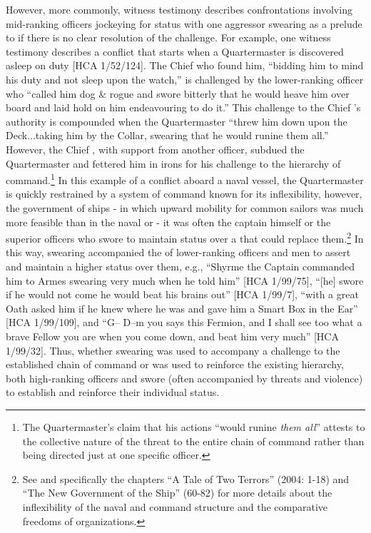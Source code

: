 However, more commonly, witness testimony describes confrontations involving mid-ranking officers jockeying for status with one aggressor swearing as a prelude to  if there is no clear resolution of the challenge. For example, one witness testimony describes a conflict that starts when a Quartermaster is discovered asleep on duty [HCA 1/52/124]. The Chief  who found him, “bidding him to mind his duty and not sleep upon the watch,” is challenged by the lower-ranking officer who “called him dog \& rogue and swore bitterly that he would heave him over board and laid hold on him endeavouring to do it.” This challenge to the Chief ’s authority is compounded when the Quartermaster “threw him down upon the Deck...taking him by the Collar, swearing that he would runine them all.” However, the Chief , with support from another officer, subdued the Quartermaster and fettered him in irons for his challenge to the hierarchy of command.\footnote{The Quartermaster’s claim that his actions “would runine \textit{them all}” attests to the collective nature of the threat to the entire chain of command rather than being directed just at one specific officer.}  In this example of a conflict aboard a naval vessel, the Quartermaster is quickly restrained by a system of command known for its inflexibility, however, the government of  ships - in which upward mobility for common sailors was much more feasible than in the naval or  - it was often the captain himself or the superior officers who swore to maintain status over a  that could replace them.\footnote{See \citeauthor{Rediker2004} and specifically the chapters “A Tale of Two Terrors” (2004: 1-18) and “The New Government of the Ship” (60-82) for more details about the inflexibility of the naval and  command structure and the comparative freedoms of  organizations.}  In this way, swearing accompanied the  of lower-ranking officers and men to assert and maintain a higher status over them, e.g., “Shyrme the Captain commanded him to Armes swearing very much when he told him” [HCA 1/99/75], “[he] swore if he would not come he would beat his brains out” [HCA 1/99/7], “with a great Oath asked him if he knew where he was and gave him a Smart Box in the Ear” [HCA 1/99/109], and “G-- D--m you says this Fermion, and I shall see too what a brave Fellow you are when you come down, and beat him very much” [HCA 1/99/32]. Thus, whether swearing was used to accompany a challenge to the established chain of command or was used to reinforce the {existing} {hierarchy, both high-ranking officers and  swore (often accompanied by threats and violence) to} establish and reinforce their individual status.

